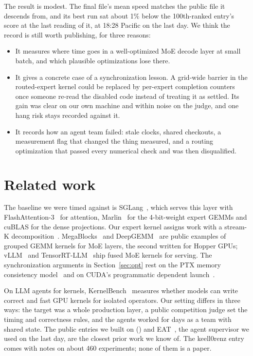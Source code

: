 \documentclass[11pt]{article}
\begin{document}
The result is modest. The final file's mean speed matches the public file it
descends from, and its best run sat about 1\% below the 100th-ranked entry's score at the last
reading of it, at 18:28 Pacific on the last day. We think the record is still worth
publishing, for three reasons:
\begin{itemize}
  \item It measures where time goes in a well-optimized MoE decode layer at small
  batch, and which plausible optimizations lose there.
  \item It gives a concrete case of a synchronization lesson. A grid-wide barrier
  in the routed-expert kernel could be replaced by per-expert completion
  counters once someone re-read the disabled code instead of treating it as
  settled. Its gain was clear on our own machine and within noise on the judge, and
  one hang risk stays recorded against it.
  \item It records how an agent team failed: stale clocks, shared checkouts,
  a measurement flag that changed the thing measured, and a routing
  optimization that passed every numerical check and was then disqualified.
\end{itemize}

\section{Related work}

The baseline we were timed against is SGLang~\cite{sglang}, which serves this
layer with FlashAttention-3~\cite{fa3} for attention, Marlin~\cite{marlin} for
the 4-bit-weight expert GEMMs and cuBLAS for the dense projections. Our expert
kernel assigns work with a stream-K decomposition~\cite{streamk}.
MegaBlocks~\cite{megablocks} and DeepGEMM~\cite{deepgemm} are public examples of
grouped GEMM kernels for MoE layers, the second written for Hopper GPUs; vLLM~\cite{vllmmoe}
and TensorRT-LLM~\cite{trtllm} ship fused MoE kernels for serving. The synchronization arguments in
Section~\ref{sec:opt} rest on the PTX memory consistency model~\cite{ptx} and on
CUDA's programmatic dependent launch~\cite{cudaguide}.

On LLM agents for kernels, KernelBench~\cite{kernelbench} measures whether models
can write correct and fast GPU kernels for isolated operators. Our setting
differs in three ways: the target was a whole production layer, a public
competition judge set the timing and correctness rules, and the agents worked
for days as a team with shared state. The public entries we built on
(\cite{keell,vjeux}) and EAT~\cite{eat}, the agent supervisor we used on the
last day, are the closest prior work we know of. The keell0renz entry comes
with notes on about 460 experiments; none of them is a paper.
\end{document}
